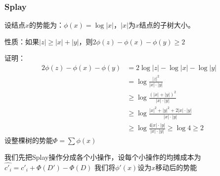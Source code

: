 \documentclass[utf8]{ctexbeamer}
\begin{document}
    \begin{frame}
        \frametitle{Splay}
        设结点$x$的势能为：$\phi(x)=\log\left\lvert x\right\rvert$，$\left\lvert x\right\rvert$为$x$结点的子树大小。

        性质：如果$\left\lvert z\right\rvert\ge\left\lvert x\right\rvert+\left\lvert y\right\rvert$，则$2\phi(z)-\phi(x)-\phi(y)\ge2$
        
        证明：
        \begin{align}
            2\phi(z)-\phi(x)-\phi(y)&=2\log\left\lvert z\right\rvert-\log\left\lvert x\right\rvert-\log\left\lvert y\right\rvert\nonumber\\
                                    &=\log\frac{\left\lvert z\right\rvert^2}{\left\lvert x\right\rvert\cdot\left\lvert y\right\rvert}\nonumber\\
                                    &\ge\log\frac{(\left\lvert x\right\rvert+\left\lvert y\right\rvert)^2}{\left\lvert x\right\rvert\cdot\left\lvert y\right\rvert}\nonumber\\
                                    &\ge\log\frac{\left\lvert x\right\rvert^2+\left\lvert y\right\rvert^2+2\left\lvert x\right\rvert\cdot\left\lvert y\right\rvert}{\left\lvert x\right\rvert\cdot\left\lvert y\right\rvert}\nonumber\\
                                    &\ge\log\frac{4\left\lvert x\right\rvert\cdot\left\lvert y\right\rvert}{\left\lvert x\right\rvert\cdot\left\lvert y\right\rvert}\ge\log4\ge2\nonumber
        \end{align}
        设整棵树的势能$\Phi=\sum \phi(x)$
        
        我们先把Splay操作分成各个小操作，设每个小操作的均摊成本为$\hat{c'_i}=c'_i+\Phi(D')-\Phi(D)$
        我们将$\phi'(x)$设为$x$移动后的势能
    \end{frame}
\end{document}
